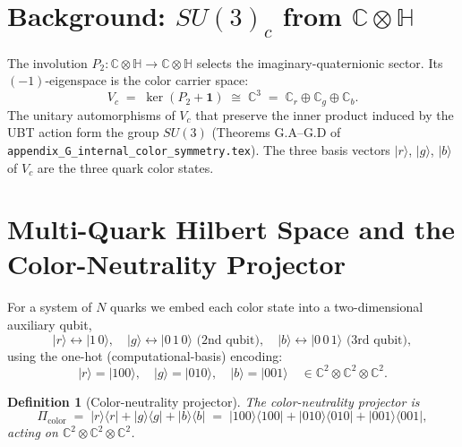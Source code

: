 \documentclass[12pt,a4paper]{article}
\newtheorem{definition}{Definition}
\newcommand{\Picolor}{\Pi_{\mathrm{color}}}
\newcommand{\CCC}{\mathbb{C}}
\newcommand{\HH}{\mathbb{H}}
\newcommand{\ket}[1]{|#1\rangle}
\newcommand{\bra}[1]{\langle #1|}
\begin{document}
\tableofcontents
\newpage

\section{Background: $SU(3)_c$ from $\CCC \otimes \HH$}
\label{sec:background}

The involution $P_2 : \CCC \otimes \HH \to \CCC \otimes \HH$ selects the
imaginary-quaternionic sector.  Its $(-1)$-eigenspace is the color carrier space:
\begin{equation}
  V_c \;=\; \ker(P_2 + \mathbf{1}) \;\cong\; \CCC^3 \;=\; \CCC_r \oplus \CCC_g \oplus \CCC_b .
\end{equation}
The unitary automorphisms of $V_c$ that preserve the inner product induced by the
UBT action form the group $SU(3)$ (Theorems G.A–G.D of
\texttt{appendix\_G\_internal\_color\_symmetry.tex}).  The three basis vectors
$\ket{r}$, $\ket{g}$, $\ket{b}$ of $V_c$ are the three quark color states.

\section{Multi-Quark Hilbert Space and the Color-Neutrality Projector}
\label{sec:hilbert}

For a system of $N$ quarks we embed each color state into a two-dimensional
auxiliary qubit,
\begin{equation}
  \ket{r} \leftrightarrow \ket{1\,0} , \quad
  \ket{g} \leftrightarrow \ket{0\,1\,0} \text{ (2nd qubit)}, \quad
  \ket{b} \leftrightarrow \ket{0\,0\,1} \text{ (3rd qubit)},
\end{equation}
using the one-hot (computational-basis) encoding:
\begin{equation}
  \ket{r} = \ket{100}, \quad \ket{g} = \ket{010}, \quad \ket{b} = \ket{001}
  \quad \in \CCC^2 \otimes \CCC^2 \otimes \CCC^2 .
\end{equation}

\begin{definition}[Color-neutrality projector]
\label{def:picolor}
The \emph{color-neutrality projector} is
\begin{equation}
  \Picolor \;=\; \ket{r}\bra{r} + \ket{g}\bra{g} + \ket{b}\bra{b}
  \;=\; \ket{100}\bra{100} + \ket{010}\bra{010} + \ket{001}\bra{001} ,
\end{equation}
acting on $\CCC^2 \otimes \CCC^2 \otimes \CCC^2$.
\end{definition}
\end{document}
